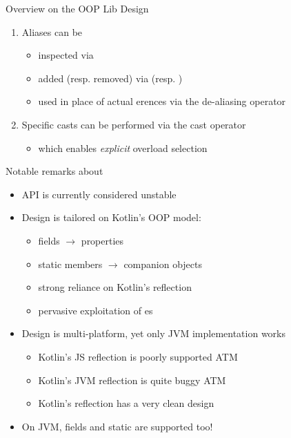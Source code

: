 \documentclass[handout]{beamer}
\begin{document}
\begin{frame}[allowframebreaks]{Overview on the OOP Lib Design}
\begin{enumerate}
        \framebreak

        \item \alert{Aliases} can be
        \begin{itemize}
            \item inspected via 
            \item added (resp. removed) via  (resp. )
            \item used in place of actual erences via the \alert{de-aliasing operator} 
        \end{itemize}

        \framebreak

        \item \alert{Specific casts} can be performed via the \alert{cast operator} 
        \begin{itemize}
            \item which enables \emph{explicit} overload selection
        \end{itemize}
    \end{enumerate}

    \framebreak

    \begin{alertblock}{Notable remarks about }
        \begin{itemize}
            \item API is currently considered unstable
            \item Design is tailored on Kotlin's OOP model:
            \begin{itemize}
                \item fields $\rightarrow$ properties
                \item static members $\rightarrow$ companion objects
                \item strong reliance on Kotlin's reflection
                \item pervasive exploitation of es
            \end{itemize}
            \item Design is multi-platform, yet only JVM implementation works
            \begin{itemize}
                \item Kotlin's JS reflection is poorly supported ATM
                \item Kotlin's JVM reflection is quite buggy ATM 
                \item Kotlin's reflection has a very clean design
            \end{itemize}
            \item On JVM, fields and static are supported too!
        \end{itemize}
    \end{alertblock}


\end{frame}
\end{document}
